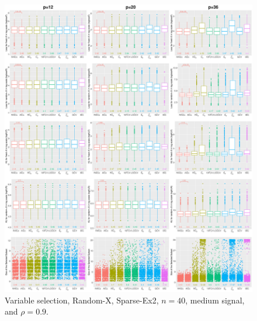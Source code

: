\begin{figure}[!ht]
\centering
\includegraphics[width=\textwidth]{figures/supplement/randomx/subset_selection/Sparse-Ex2_n40_msnr_rho09.eps}
\caption{Variable selection, Random-X, Sparse-Ex2, $n=40$, medium signal, and $\rho=0.9$.}
\end{figure}
\clearpage
